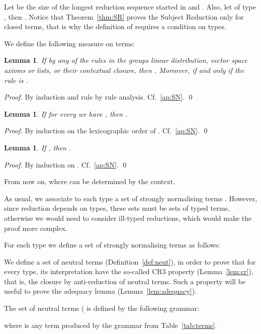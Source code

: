 \documentclass[preprint]{elsarticle}
\newtheorem{lemma}[theorem]{Lemma}
\begin{document}
Let  be the size of the longest reduction sequence started in  and
. Also, let  of type , then . Notice that Theorem~\ref{thm:SR} proves the Subject Reduction only
for closed terms, that is why the definition of  requires a condition on types.

\begin{definition}
  We define the following measure  on terms:
  
\end{definition}

\begin{lemma}\label{lem:size}
  If  by any of the rules in the groups linear distribution,
  vector space axioms or lists, or their contextual closure, then . Moreover,  if and only if the rule is .
\end{lemma}
\begin{proof}
  By induction and rule by rule analysis. Cf.~\ref{ap:SN}.
  \qed
\end{proof}

\begin{lemma}\label{lem:ri_in_snset_implies_sum_ri_in_snset}
  If for every  we have ,
  then .
\end{lemma}
\begin{proof}
  By induction on the lexicographic order of . Cf.~\ref{ap:SN}. \qed
\end{proof}

\begin{lemma}\label{lem:t_implies_proj_t}
  If , then .
\end{lemma}

\begin{proof}
  By induction on . Cf.~\ref{ap:SN}. \qed
\end{proof}

From now on,  where  can be determined by the context.

As usual, we associate to each type  a set of strongly normalising terms
. However, since reduction depends on types, these sets must be
sets of typed terms, otherwise we would need to consider ill-typed reductions,
which would make the proof more complex.
\begin{definition}
  For each type  we define a set of strongly normalising terms as follows:
  
\end{definition}

We define a set of neutral terms (Definition~\ref{def:neut}), in order to prove
that for every type, its interpretation have the so-called CR3 property
(Lemma~\ref{lem:cr}), that is, the closure by anti-reduction of neutral terms.
Such a property will be useful to prove the adequacy lemma
(Lemma~\ref{lem:adequacy}).
\begin{definition}\label{def:neut}
  The set of neutral terms ( is defined by the following
  grammar:
  
  where  is any term produced by the grammar from Table~\ref{tab:terms}.
\end{definition}
\end{document}
